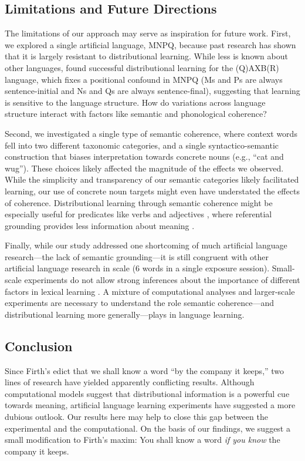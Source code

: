 \documentclass[man,floatsintext]{apa6}
\begin{document}
\subsection{Limitations and Future Directions}

The limitations of our approach may serve as inspiration for future work. First, we explored a single artificial language, MNPQ, because past research has shown that it is largely resistant to distributional learning. While less is known about other languages, \cite{reeder2009} found successful distributional learning for the (Q)AXB(R) language, which fixes a positional confound in MNPQ (Ms and Ps are always sentence-initial and Ns and Qs are always sentence-final), suggesting that learning is sensitive to the language structure. How do variations across language structure interact with factors like semantic and phonological coherence? 

Second, we investigated a single type of semantic coherence, where context words fell into two different taxonomic categories, and a single syntactico-semantic construction that biases interpretation towards concrete nouns (e.g., ``cat and wug''). These choices likely affected the magnitude of the effects we observed. While the simplicity and transparency of our semantic categories likely facilitated learning, our use of concrete noun targets might even have understated the effects of coherence. Distributional learning through semantic coherence might be especially useful for predicates like verbs and adjectives \citep{redington1998}, where referential grounding provides less information about meaning \citep{gleitman1990}.

Finally, while our study addressed one shortcoming of much artificial language research---the lack of semantic grounding---it is still congruent with other artificial language research in scale (6 words in a single exposure session). Small-scale experiments do not allow strong inferences about the importance of different factors in lexical learning \citep{romberg2010, frank2013}. A mixture of computational analyses and larger-scale experiments are necessary to understand the role semantic coherence---and distributional learning more generally---plays in language learning.

\subsection{Conclusion}
Since Firth's edict that we shall know a word ``by the company it keeps,'' two lines of research have yielded apparently conflicting results. Although computational models suggest that distributional information is a powerful cue towards meaning, artificial language learning experiments have suggested a more dubious outlook. Our results here may help to close this gap between the experimental and the computational. On the basis of our findings, we suggest a small modification to Firth's maxim: You shall know a word \emph{if you know} the company it keeps.
\end{document}
